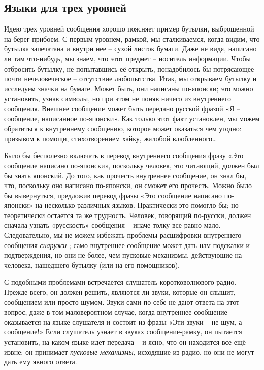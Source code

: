\documentclass[../main.tex]{subfiles}
\begin{document}
\subsection{Языки для трех уровней}

Идею трех уровней сообщения хорошо поясняет пример бутылки, выброшенной на берег прибоем. С первым уровнем, рамкой, мы сталкиваемся, когда видим, что бутылка запечатана и внутри нее \--- сухой листок бумаги. Даже не видя, написано ли там что-нибудь, мы знаем, что этот предмет \--- носитель информации. Чтобы отбросить бутылку, не попытавшись её открыть, понадобилось бы потрясающее \--- почти нечеловеческое \--- отсутствие любопытства. Итак, мы открываем бутылку и исследуем значки на бумаге. Может быть, они написаны по-японски; это можно установить, узнав символы, но при этом не поняв ничего из внутреннего сообщения. Внешнее сообщение может быть передано русской фразой «Я \--- сообщение, написанное по-японски». Как только этот факт установлен, мы можем обратиться к внутреннему сообщению, которое может оказаться чем угодно: призывом к помощи, стихотворением хайку, жалобой влюбленного\ldots{}

Было бы бесполезно включать в перевод внутреннего сообщения фразу «Это сообщение написано по-японски», поскольку человек, это читающий, должен был бы знать японский. До того, как прочесть внутреннее сообщение, он знал бы, что, поскольку оно написано по-японски, он сможет его прочесть. Можно было бы вывернуться, предложив перевод фразы «Это сообщение написано по-японски» на несколько различных языков. Практически это помогло бы; но теоретически остается та же трудность. Человек, говорящий по-русски, должен сначала узнать «русскость» сообщения \--- иначе толку все равно мало. Следовательно, мы не можем избежать проблемы расшифровки внутреннего сообщения \emph{снаружи} ; само внутреннее сообщение может дать нам подсказки и подтверждения, но они не более, чем пусковые механизмы, действующие на человека, нашедшего бутылку (или на его помощников).

С подобными проблемами встречается слушатель коротковолнового радио. Прежде всего, он должен решить, являются ли звуки, которые он слышит, сообщением или просто шумом. Звуки сами по себе не дают ответа на этот вопрос, даже в том маловероятном случае, когда внутреннее сообщение оказывается на языке слушателя и состоит из фразы «Эти звуки \--- не шум, а сообщение!» Если слушатель узнает в звуках сообщение-рамку, он пытается установить, на каком языке идет передача \--- и ясно, что он находится все ещё извне; он принимает \emph{пусковые механизмы}, исходящие из радио, но они не могут дать ему явного ответа.
\end{document}
